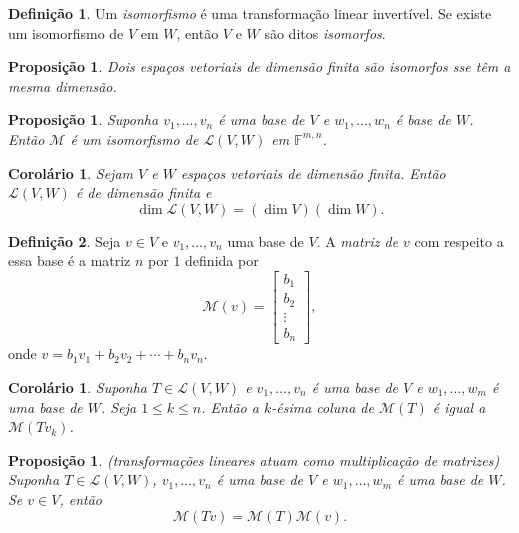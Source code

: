 \documentclass[12pt]{article}
\theoremstyle{plain}
\newtheorem{prop}[thm]{Proposição}
\newtheorem{cor}[thm]{Corolário}
\theoremstyle{definition}
\newtheorem{defn}{Definição}[section]
\theoremstyle{remark}
\begin{document}
\begin{defn}
    Um \emph{isomorfismo} é uma transformação linear invertível. Se existe um isomorfismo de \(V\) em \(W\), então \(V\) e \(W\) são ditos \emph{isomorfos}.
\end{defn}

\begin{prop}
    Dois espaços vetoriais de dimensão finita são isomorfos sse têm a mesma dimensão.
\end{prop}

\begin{prop}
    Suponha \(v_1, \ldots, v_n\) é uma base de \(V\) e \(w_1, \ldots, w_n\) é base de \(W\). Então \(\mathcal{M}\) é um isomorfismo de \(\mathcal{L}(V, W)\) em \(\mathbb{F}^{m,n}\).
\end{prop}

\begin{cor}
    Sejam \(V\) e \(W\) espaços vetoriais de dimensão finita. Então \(\mathcal{L}(V, W)\) é de dimensão finita e
    \[
        \dim \mathcal{L}(V, W) = (\dim V)(\dim W).
    \]
\end{cor}

\begin{defn}
    Seja \(v \in V\) e \(v_1,\ldots,v_n\) uma base de \(V\). A \emph{matriz de \(v\)} com respeito a essa base é a matriz \(n\) por \(1\) definida por
    \[
        \mathcal{M}(v) = \begin{bmatrix}
            b_1 \\
            b_2 \\
            \vdots \\
            b_n
        \end{bmatrix},
    \]
    \noindent onde \(v = b_1 v_1 + b_2 v_2 + \cdots + b_n v_n\).
\end{defn}

\begin{cor}
    Suponha \(T \in \mathcal{L}(V, W)\) e \(v_1,\ldots,v_n\) é uma base de \(V\) e \(w_1,\ldots,w_m\) é uma base de \(W\). Seja \(1 \leq k \leq n\). Então a \(k\)-ésima coluna de \(\mathcal{M}(T)\) é igual a \(\mathcal{M}(Tv_k)\).
\end{cor}

\begin{prop} (transformações lineares atuam como multiplicação de matrizes)
    Suponha \(T \in \mathcal{L}(V, W)\), \(v_1,\ldots,v_n\) é uma base de \(V\) e \(w_1,\ldots,w_m\) é uma base de \(W\). Se \(v \in V\), então
    \[
        \mathcal{M}(Tv) = \mathcal{M}(T) \mathcal{M}(v).
    \]
\end{prop}
\end{document}
